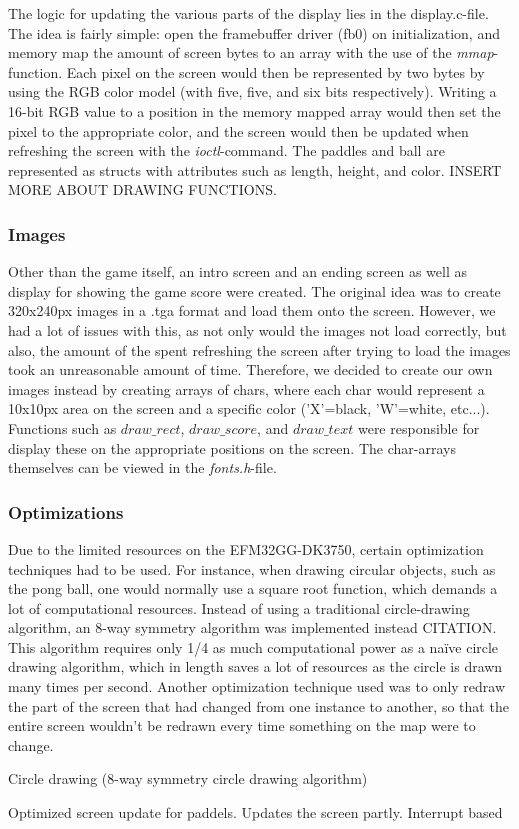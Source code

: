 The logic for updating the various parts of the display lies in the display.c-file. The idea is fairly simple: open the framebuffer driver (fb0) on initialization, and memory map the amount of screen bytes to an array with the use of the \emph{mmap}-function. Each pixel on the screen would then be represented by two bytes by using the RGB color model (with five, five, and six bits respectively). Writing a 16-bit RGB value to a position in the memory mapped array would then set the pixel to the appropriate color, and the screen would then be updated when refreshing the screen with the \emph{ioctl}-command. The paddles and ball are represented as structs with attributes such as length, height, and color. INSERT MORE ABOUT DRAWING FUNCTIONS.

\subsubsection{Images}

Other than the game itself, an intro screen and an ending screen as well as display for showing the game score were created. The original idea was to create 320x240px images in a .tga format and load them onto the screen. However, we had a lot of issues with this, as not only would the images not load correctly, but also, the amount of the spent refreshing the screen after trying to load the images took an unreasonable amount of time. Therefore, we decided to create our own images instead by creating arrays of chars, where each char would represent a 10x10px area on the screen and a specific color ('X'=black, 'W'=white, etc...). Functions such as \emph{$draw\_rect$}, \emph{$draw\_score$}, and \emph{$draw\_text$} were responsible for display these on the appropriate positions on the screen. The char-arrays themselves can be viewed in the \emph{fonts.h}-file.


\subsubsection{Optimizations}

Due to the limited resources on the EFM32GG-DK3750, certain optimization techniques had to be used. For instance, when drawing circular objects, such as the pong ball, one would normally use a square root function, which demands a lot of computational resources. Instead of using a traditional circle-drawing algorithm, an 8-way symmetry algorithm was implemented instead CITATION. This algorithm requires only 1/4 as much computational power as a naïve circle drawing algorithm, which in length saves a lot of resources as the circle is drawn many times per second.
	Another optimization technique used was to only redraw the part of the screen that had changed from one instance to another, so that the entire screen wouldn't be redrawn every time something on the map were to change.  

Circle drawing (8-way symmetry circle drawing algorithm)

Optimized screen update for paddels. Updates the screen partly. Interrupt based 
